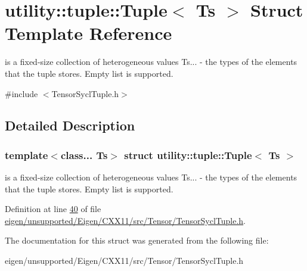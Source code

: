\hypertarget{structutility_1_1tuple_1_1_tuple}{}\section{utility\+:\+:tuple\+:\+:Tuple$<$ Ts $>$ Struct Template Reference}
\label{structutility_1_1tuple_1_1_tuple}


is a fixed-\/size collection of heterogeneous values  Ts... -\/ the types of the elements that the tuple stores. Empty list is supported.  




{\ttfamily \#include $<$Tensor\+Sycl\+Tuple.\+h$>$}



\subsection{Detailed Description}
\subsubsection*{template$<$class... Ts$>$\newline
struct utility\+::tuple\+::\+Tuple$<$ Ts $>$}

is a fixed-\/size collection of heterogeneous values  Ts... -\/ the types of the elements that the tuple stores. Empty list is supported. 

Definition at line \hyperlink{eigen_2unsupported_2_eigen_2_c_x_x11_2src_2_tensor_2_tensor_sycl_tuple_8h_source_l00040}{40} of file \hyperlink{eigen_2unsupported_2_eigen_2_c_x_x11_2src_2_tensor_2_tensor_sycl_tuple_8h_source}{eigen/unsupported/\+Eigen/\+C\+X\+X11/src/\+Tensor/\+Tensor\+Sycl\+Tuple.\+h}.



The documentation for this struct was generated from the following file\+:\begin{DoxyCompactItemize}
\item 
eigen/unsupported/\+Eigen/\+C\+X\+X11/src/\+Tensor/\+Tensor\+Sycl\+Tuple.\+h\end{DoxyCompactItemize}
